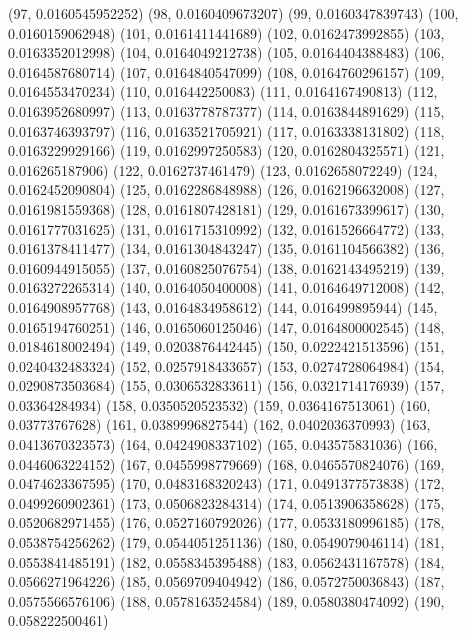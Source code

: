 {					(97, 0.0160545952252)
					(98, 0.0160409673207)
					(99, 0.0160347839743)
					(100, 0.0160159062948)
					(101, 0.0161411441689)
					(102, 0.0162473992855)
					(103, 0.0163352012998)
					(104, 0.0164049212738)
					(105, 0.0164404388483)
					(106, 0.0164587680714)
					(107, 0.0164840547099)
					(108, 0.0164760296157)
					(109, 0.0164553470234)
					(110, 0.016442250083)
					(111, 0.0164167490813)
					(112, 0.0163952680997)
					(113, 0.0163778787377)
					(114, 0.0163844891629)
					(115, 0.0163746393797)
					(116, 0.0163521705921)
					(117, 0.0163338131802)
					(118, 0.0163229929166)
					(119, 0.0162997250583)
					(120, 0.0162804325571)
					(121, 0.016265187906)
					(122, 0.0162737461479)
					(123, 0.0162658072249)
					(124, 0.0162452090804)
					(125, 0.0162286848988)
					(126, 0.0162196632008)
					(127, 0.0161981559368)
					(128, 0.0161807428181)
					(129, 0.0161673399617)
					(130, 0.0161777031625)
					(131, 0.0161715310992)
					(132, 0.0161526664772)
					(133, 0.0161378411477)
					(134, 0.0161304843247)
					(135, 0.0161104566382)
					(136, 0.0160944915055)
					(137, 0.0160825076754)
					(138, 0.0162143495219)
					(139, 0.0163272265314)
					(140, 0.0164050400008)
					(141, 0.0164649712008)
					(142, 0.0164908957768)
					(143, 0.0164834958612)
					(144, 0.016499895944)
					(145, 0.0165194760251)
					(146, 0.0165060125046)
					(147, 0.0164800002545)
					(148, 0.0184618002494)
					(149, 0.0203876442445)
					(150, 0.0222421513596)
					(151, 0.0240432483324)
					(152, 0.0257918433657)
					(153, 0.0274728064984)
					(154, 0.0290873503684)
					(155, 0.0306532833611)
					(156, 0.0321714176939)
					(157, 0.03364284934)
					(158, 0.0350520523532)
					(159, 0.0364167513061)
					(160, 0.03773767628)
					(161, 0.0389996827544)
					(162, 0.0402036370993)
					(163, 0.0413670323573)
					(164, 0.0424908337102)
					(165, 0.043575831036)
					(166, 0.0446063224152)
					(167, 0.0455998779669)
					(168, 0.0465570824076)
					(169, 0.0474623367595)
					(170, 0.0483168320243)
					(171, 0.0491377573838)
					(172, 0.0499260902361)
					(173, 0.0506823284314)
					(174, 0.0513906358628)
					(175, 0.0520682971455)
					(176, 0.0527160792026)
					(177, 0.0533180996185)
					(178, 0.0538754256262)
					(179, 0.0544051251136)
					(180, 0.0549079046114)
					(181, 0.0553841485191)
					(182, 0.0558345395488)
					(183, 0.0562431167578)
					(184, 0.0566271964226)
					(185, 0.0569709404942)
					(186, 0.0572750036843)
					(187, 0.0575566576106)
					(188, 0.0578163524584)
					(189, 0.0580380474092)
					(190, 0.058222500461)
}
